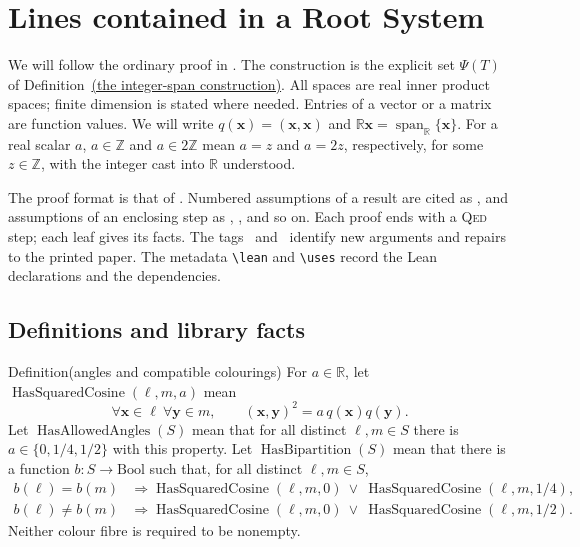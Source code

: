 \documentclass[11pt]{amsart}
\newcommand\ints{{\mathbb Z}}
\newcommand\re{{\mathbb R}}%
\newcommand\Zy{{\mathbf y}}
\newcommand\Zx{{\mathbf x}}
\newcommand\opk[1]{\mathop{\mathrm{#1}}\nolimits}
\begin{document}

\section{Lines contained in a Root System}\label{sec:thm312}
We will follow the ordinary proof in
. The construction is the explicit set
$\Psi(T)$ of Definition~\hyperref[def:312-integral-roots]{(the integer-span construction)}.
All spaces are real inner product spaces; finite dimension is stated
where needed. Entries of a vector or a matrix are function values.
We will write $q(\Zx)=(\Zx,\Zx)$ and
$\re\Zx=\opk{span}_{\re}\{\Zx\}$. For a real scalar $a$,
$a\in\ints$ and
$a\in2\ints$ mean $a=z$ and $a=2z$, respectively, for some $z\in\ints$,
with the integer cast into $\re$ understood.

The proof format is that of \cite{L95}. Numbered assumptions of a result
are cited as , and assumptions of an enclosing step as
, , and so on. Each proof ends with a \textsc{Qed} step;
each leaf gives its facts. The tags \new\ and \repair\ identify new
arguments and repairs to the printed paper. The metadata
\verb|\lean| and \verb|\uses| record the Lean declarations and the dependencies.

\subsection{Definitions and library facts}

\begin{namedresult}{Definition}{(angles and compatible colourings)}\label{def:312-angles}
\uses{}
For $a\in\re$, let $\opk{HasSquaredCosine}(\ell,m,a)$ mean
\[
 \forall\Zx\in\ell\ \forall\Zy\in m,\qquad
 (\Zx,\Zy)^2=a\,q(\Zx)q(\Zy).
\]
Let $\opk{HasAllowedAngles}(S)$ mean that for all distinct
$\ell,m\in S$ there is $a\in\{0,1/4,1/2\}$ with this property.
Let $\opk{HasBipartition}(S)$ mean that there is a function
$b:S\to\mathrm{Bool}$ such that, for all distinct $\ell,m\in S$,
\[
\begin{array}{ll}
b(\ell)=b(m)&\Longrightarrow
 \opk{HasSquaredCosine}(\ell,m,0)\ \lor\
 \opk{HasSquaredCosine}(\ell,m,1/4),\\
b(\ell)\ne b(m)&\Longrightarrow
 \opk{HasSquaredCosine}(\ell,m,0)\ \lor\
 \opk{HasSquaredCosine}(\ell,m,1/2).
\end{array}
\]
Neither colour fibre is required to be nonempty.
\end{namedresult}
\end{document}
